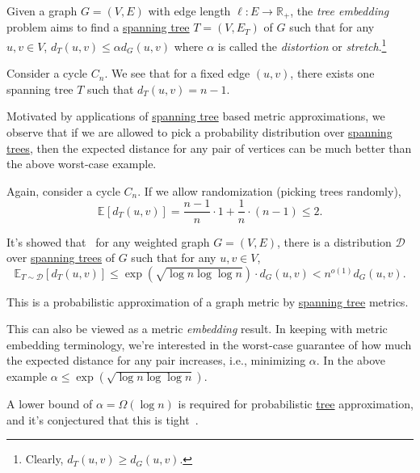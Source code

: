 \begin{problem}\label{prb:tree-embedding}
Given a graph \(G=(V, E)\) with edge length \(\ell \colon E \to \mathbb{R} _+\), the \emph{tree embedding} problem aims to find a \hyperref[def:spanning-tree]{spanning tree} \(T = (V, E_T)\) of \(G\) such that for any \(u, v \in V\), \(d_T(u, v) \leq \alpha d_G(u, v)\) where \(\alpha \) is called the \emph{distortion} or \emph{stretch}.\footnote{Clearly, \(d_T(u, v) \geq d_G(u, v)\).}
\end{problem}

\begin{eg}[Cycle]
	Consider a cycle \(C_n\). We see that for a fixed edge \((u, v)\), there exists one spanning tree \(T\) such that \(d_T(u, v) = n - 1\).
\end{eg}

Motivated by applications of \hyperref[def:spanning-tree]{spanning tree} based metric approximations, we observe that if we are allowed to pick a probability distribution over \hyperref[def:spanning-tree]{spanning trees}, then the expected distance for any pair of vertices can be much better than the above worst-case example.

\begin{eg}[Cycle]
	Again, consider a cycle \(C_n\). If we allow randomization (picking trees randomly),
	\[
		\mathbb{E}_{}[d_T(u, v)]
		= \frac{n-1}{n} \cdot 1 + \frac{1}{n} \cdot (n-1)
		\leq 2.
	\]
\end{eg}

It's showed that~\cite{alon1995graph} for any weighted graph \(G = (V, E)\), there is a distribution \(\mathcal{D} \) over \hyperref[def:spanning-tree]{spanning trees} of \(G\) such that for any \(u, v \in V\),
\[
	\mathbb{E}_{T \sim \mathcal{D} }[d_T(u, v)]
	\leq \exp (\sqrt{\log n \log \log n} ) \cdot d_G(u, v)
	< n^{o(1)} d_G(u, v).
\]

\begin{intuition}
	This is a probabilistic approximation of a graph metric by \hyperref[def:spanning-tree]{spanning tree} metrics.
\end{intuition}

This can also be viewed as a metric \emph{embedding} result. In keeping with metric embedding terminology, we're interested in the worst-case guarantee of how much the expected distance for any pair increases, i.e., minimizing \(\alpha \). In the above example \(\alpha \leq \exp (\sqrt{\log n \log \log n} )\).

\begin{note}
	A lower bound of \(\alpha = \Omega (\log n)\) is required for probabilistic \hyperref[def:spanning-tree]{tree} approximation, and it's conjectured that this is tight~\cite{alon1995graph}.
\end{note}

